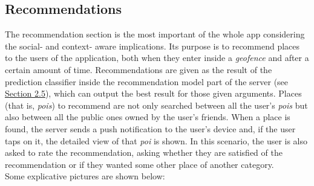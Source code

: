 \documentclass[../../main]{subfiles}
\begin{document}
\subsection{Recommendations}
\label{ss:final-recommendations}

The recommendation section is the most important of the whole app considering the social- and context- aware implications.
Its purpose is to recommend places to the users of the application, both when they enter inside a \textit{geofence} and after a certain amount of time.
Recommendations are given as the result of the prediction classifier inside the recommendation model part of the server (see \hyperref[ss:recommendation-model]{Section 2.5}), which can output the best result for those given arguments. 
Places (that is, \textit{pois}) to recommend are not only searched between all the user's \textit{pois} but also between all the public ones owned by the user's friends.
When a place is found, the server sends a push notification to the user's device and, if the user taps on it, the detailed view of that \textit{poi} is shown.
In this scenario, the user is also asked to rate the recommendation, asking whether they are satisfied of the recommendation or if they wanted some other place of another category.\\
Some explicative pictures are shown below:
\end{document}
